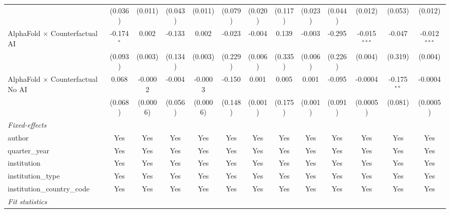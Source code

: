\begin{tabular}{lcccccccccccc}
                                            & (0.036)      & (0.011)     & (0.043)       & (0.011)     & (0.079) & (0.020) & (0.117) & (0.023) & (0.044)       & (0.012)        & (0.053)       & (0.012)\\   
   AlphaFold $\times$ Counterfactual AI     & -0.174$^{*}$ & 0.002       & -0.133        & 0.002       & -0.023  & -0.004  & 0.139   & -0.003  & -0.295        & -0.015$^{***}$ & -0.047        & -0.012$^{***}$\\   
                                            & (0.093)      & (0.003)     & (0.134)       & (0.003)     & (0.229) & (0.006) & (0.335) & (0.006) & (0.226)       & (0.004)        & (0.319)       & (0.004)\\   
   AlphaFold $\times$ Counterfactual No AI  & 0.068        & -0.0002     & -0.004        & -0.0003     & -0.150  & 0.001   & 0.005   & 0.001   & -0.095        & -0.0004        & -0.175$^{**}$ & -0.0004\\   
                                            & (0.068)      & (0.0006)    & (0.056)       & (0.0006)    & (0.148) & (0.001) & (0.175) & (0.001) & (0.091)       & (0.0005)       & (0.081)       & (0.0005)\\   
   \midrule
   \emph{Fixed-effects}\\
   author                                   & Yes          & Yes         & Yes           & Yes         & Yes     & Yes     & Yes     & Yes     & Yes           & Yes            & Yes           & Yes\\  
   quarter\_year                            & Yes          & Yes         & Yes           & Yes         & Yes     & Yes     & Yes     & Yes     & Yes           & Yes            & Yes           & Yes\\  
   institution                              & Yes          & Yes         & Yes           & Yes         & Yes     & Yes     & Yes     & Yes     & Yes           & Yes            & Yes           & Yes\\  
   institution\_type                        & Yes          & Yes         & Yes           & Yes         & Yes     & Yes     & Yes     & Yes     & Yes           & Yes            & Yes           & Yes\\  
   institution\_country\_code               & Yes          & Yes         & Yes           & Yes         & Yes     & Yes     & Yes     & Yes     & Yes           & Yes            & Yes           & Yes\\  
   \midrule
   \emph{Fit statistics}\\

\end{tabular}
